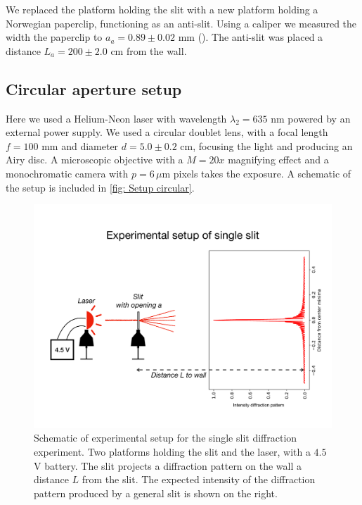 \documentclass{emulateapj}
\begin{document}
We replaced the platform holding the slit with a new platform holding a Norwegian paperclip, functioning as an anti-slit. Using a caliper we measured the width the paperclip to $a_a = 0.89 \pm 0.02 $ mm (\cite{SuperCaliper}). The anti-slit was placed a distance $L_a = 200 \pm 2.0$ cm from the wall.

\subsection{Circular aperture setup}
\label{subsec: Data/circular setup}
Here we used a Helium-Neon laser with wavelength $\lambda_2 = 635$ nm powered by an external power supply. We used a circular doublet lens, with a focal length $f=100$ mm and diameter $d = 5.0 \pm 0.2$ cm, focusing the light and producing an Airy disc. A microscopic objective with a $M = 20x$ magnifying effect and a monochromatic camera with $p=6 \, \mu$m pixels takes the exposure. A schematic of the setup is included in \cref{fig: Setup circular}.

\begin{figure}
	\centering
	\includegraphics[width=\linewidth]{exp_setup.pdf}
	\caption[Experimental setup single slit]{Schematic of experimental setup for the single slit diffraction experiment. Two platforms holding the slit and the laser, with a $4.5$ V battery. The slit projects a diffraction pattern on the wall a distance $L$ from the slit. The expected intensity of the diffraction pattern produced by a general slit is shown on the right.}
	\label{fig: Setup slit}
\end{figure}
\end{document}

